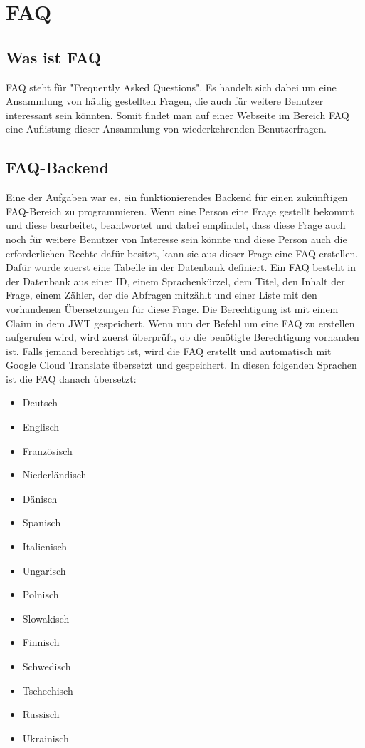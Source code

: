 \chapter{FAQ}
\section{Was ist FAQ}
FAQ steht für "Frequently Asked Questions". Es handelt sich dabei um eine Ansammlung von häufig gestellten Fragen, die auch für weitere Benutzer interessant sein könnten. Somit findet man auf einer Webseite im Bereich FAQ eine Auflistung dieser Ansammlung von wiederkehrenden Benutzerfragen.
\section{FAQ-Backend}
Eine der Aufgaben war es, ein funktionierendes Backend für einen zukünftigen FAQ-Bereich zu programmieren. Wenn eine Person eine Frage gestellt bekommt und diese bearbeitet, beantwortet und dabei empfindet, dass diese Frage auch noch für weitere Benutzer von Interesse sein könnte und diese Person auch die erforderlichen Rechte dafür besitzt, kann sie aus dieser Frage eine FAQ erstellen.\\
Dafür wurde zuerst eine Tabelle in der Datenbank definiert. Ein FAQ besteht in der Datenbank aus einer ID, einem Sprachenkürzel, dem Titel, den Inhalt der Frage, einem Zähler, der die Abfragen mitzählt und einer Liste mit den vorhandenen Übersetzungen für diese Frage. Die Berechtigung ist mit einem Claim in dem JWT gespeichert. Wenn nun der Befehl um eine FAQ zu erstellen aufgerufen wird, wird zuerst überprüft, ob die benötigte Berechtigung vorhanden ist. Falls jemand berechtigt ist, wird die FAQ erstellt und automatisch mit Google Cloud Translate übersetzt und gespeichert. In diesen folgenden Sprachen ist die FAQ danach übersetzt:
\begin{multicols}{2}
	\begin{itemize}
		\item Deutsch
		\item Englisch
		\item Französisch
		\item Niederländisch
		\item Dänisch
		\item Spanisch
		\item Italienisch
		\item Ungarisch
		\item Polnisch
		\item Slowakisch
		\item Finnisch
		\item Schwedisch
		\item Tschechisch
		\item Russisch
		\item Ukrainisch
	\end{itemize}
\end{multicols}